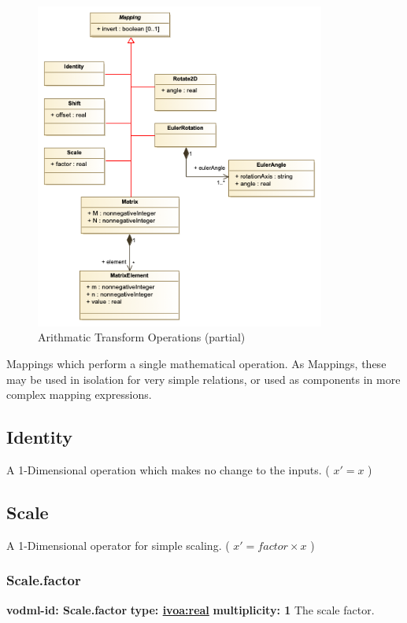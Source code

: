   \begin{figure}[h]
  \begin{center}
    \includegraphics[width=3.75in]{diagrams/basic_operations.png}
    \caption{Arithmatic Transform Operations (partial)}\label{fig:basicOps}
  \end{center}
  \end{figure}

  Mappings which perform a single mathematical operation. As Mappings, these may be used in isolation for very simple relations, or used as components in more complex mapping expressions.

  \subsection{Identity}
  \label{sect:Identity}
    A 1-Dimensional operation which makes no change to the inputs. ( $x' = x$ )

  \subsection{Scale}
  \label{sect:Scale}
    A 1-Dimensional operator for simple scaling. ( $x' = factor \times x$ )

    \subsubsection{Scale.factor}
      \textbf{vodml-id: Scale.factor} \newline
      \textbf{type: \hyperref[sect:ivoa]{ivoa:real}} \newline
      \textbf{multiplicity: 1} \newline 
      The scale factor.

